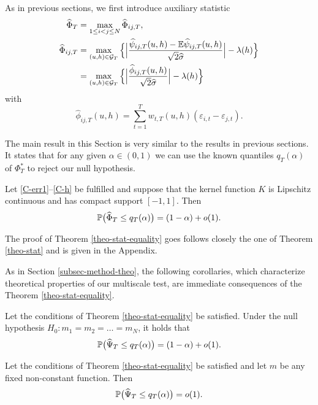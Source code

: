 \documentclass[a4paper,12pt]{article}
\numberwithin{equation}{section}
\begin{document}
As in previous sections, we first introduce auxiliary statistic 
\begin{align*}
\widehat{\Phi}_T &= \max_{1\le i < j \le N} \widehat{\Phi}_{ij, T},\\
\widehat{\Phi}_{ij,T} 
 & = \max_{(u,h) \in \mathcal{G}_T} \Big\{ \Big| \frac{\widehat{\psi}_{ij,T}(u,h) - \mathbb{E} \widehat{\psi}_{ij,T}(u,h)}{\sqrt{2}\widehat{\sigma}} \Big| - \lambda(h) \Big\} \\
 & = \max_{(u,h) \in \mathcal{G}_T} \Big\{ \Big| \frac{\widehat{\phi}_{ij,T}(u,h)} {\sqrt{2}\widehat{\sigma}} \Big| - \lambda(h) \Big \} 
\end{align*}
with 
\[ \widehat{\phi}_{ij,T}(u,h) = \sum\limits_{t=1}^T w_{t,T}(u,h) (\varepsilon_{i,t} - \varepsilon_{j,t}). \]


The main result in this Section is very similar to the results in previous sections. It states that for any given $\alpha \in (0,1)$ we can use the known quantiles $q_T(\alpha)$ of $\Phi_T^*$ to reject our null hypothesis.
\begin{theorem}\label{theo-stat-equality}
Let \ref{C-err1}--\ref{C-h} be fulfilled and suppose that the kernel function $K$ is Lipschitz continuous and has compact support $[-1,1]$. Then 
\[ \mathbb{P} \big( \widehat{\Phi}_T \le q_T(\alpha) \big) = (1 - \alpha) + o(1). \]
\end{theorem}
The proof of Theorem \ref{theo-stat-equality} goes follows closely the one of Theorem \ref{theo-stat} and is given in the Appendix.

As in Section \ref{subsec-method-theo}, the following corollaries, which characterize theoretical properties of our multiscale test, are immediate consequences of the Theorem \ref{theo-stat-equality}. 
\begin{corollary}\label{corollary-test-equality-1}
Let the conditions of Theorem \ref{theo-stat-equality} be satisfied. Under the null hypothesis $H_0: m_1 = m_2 = \ldots = m_N$, it holds that 
\[ \mathbb{P} \big( \widehat{\Psi}_T \le q_T(\alpha) \big) = (1 - \alpha) + o(1). \]
\end{corollary}
\begin{corollary}\label{corollary-test-equality-2}
Let the conditions of Theorem \ref{theo-stat-equality} be satisfied and let $m$ be any fixed non-constant function. Then 
\[ \mathbb{P} \big( \widehat{\Psi}_T \le q_T(\alpha) \big) = o(1). \]
\end{corollary}
\end{document}
